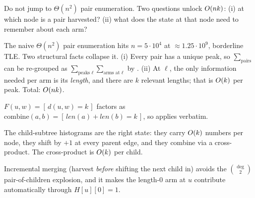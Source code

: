 \begin{attemptgate}
Do not jump to $\Theta(n^2)$ pair enumeration. Two questions unlock
$O(nk)$: (i) at which node is a pair harvested? (ii) what does the
state at that node need to remember about each arm?
\end{attemptgate}

The naive $\Theta(n^2)$ pair enumeration hits $n=5\cdot 10^{4}$ at
$\approx 1.25\cdot 10^{9}$, borderline TLE. Two structural facts collapse
it. (i) Every pair has a unique peak, so $\sum_{\text{pairs}}$ can be
re-grouped as $\sum_{\text{peaks }\ell}\sum_{\text{arms at }\ell}$ by
. (ii) At $\ell$, the only information needed per
arm is its \emph{length}, and there are $k$ relevant lengths; that is
$O(k)$ per peak. Total: $O(nk)$.

\begin{observation}
$F(u,w) = [\,d(u,w)=k\,]$ factors as $\mathrm{combine}(a,b)=[\,\mathit{len}(a)+\mathit{len}(b)=k\,]$,
so  applies verbatim.
\end{observation}
\begin{observation}
The child-subtree histograms are the right state: they carry $O(k)$
numbers per node, they shift by $+1$ at every parent edge, and they
combine via a cross-product. The cross-product is $O(k)$ per child.
\end{observation}
\begin{observation}
Incremental merging (harvest \emph{before} shifting the next child in)
avoids the $\binom{\deg}{2}$ pair-of-children explosion, and it makes the
length-$0$ arm at $u$ contribute automatically through $\mathit{H}[u][0]=1$.
\end{observation}

